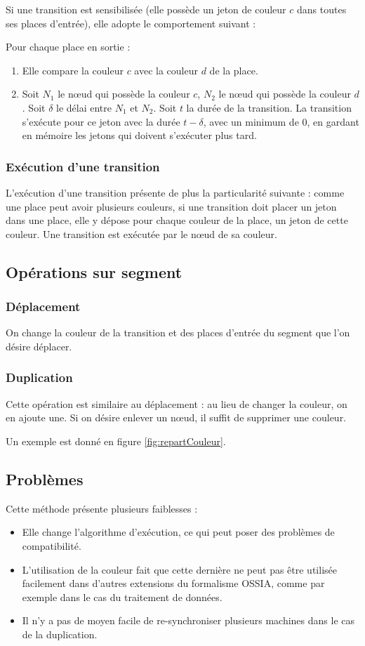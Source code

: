 Si une transition est sensibilisée (elle possède un jeton de couleur $c$ dans toutes ses places d'entrée), elle adopte le comportement suivant : 

Pour chaque place en sortie :
\begin{enumerate}
\item Elle compare la couleur $c$ avec la couleur $d$ de la place. 
\item Soit $N_1$ le nœud qui possède la couleur $c$, $N_2$ le nœud qui possède la couleur $d$. Soit $\delta$ le délai entre $N_1$ et $N_2$. Soit $t$ la durée de la transition. La transition s'exécute pour ce jeton avec la durée $t - \delta$, avec un minimum de 0, en gardant en mémoire les jetons qui doivent s'exécuter plus tard.
\end{enumerate}

\subsubsection{Exécution d'une transition}
L'exécution d'une transition présente de plus la particularité suivante : comme une place peut avoir plusieurs couleurs, si une transition doit placer un jeton dans une place, elle y dépose pour chaque couleur de la place, un jeton de cette couleur. 
Une transition est exécutée par le nœud de sa couleur.

\subsection{Opérations sur segment}
\subsubsection{Déplacement}
On change la couleur de la transition et des places d'entrée du segment que l'on désire déplacer.

\subsubsection{Duplication}
Cette opération est similaire au déplacement : au lieu de changer la couleur, on en ajoute une. Si on désire enlever un nœud, il suffit de supprimer une couleur.

Un exemple est donné en figure \ref{fig:repartCouleur}.

\subsection{Problèmes}
Cette méthode présente plusieurs faiblesses : 
\begin{itemize}
	\item Elle change l'algorithme d'exécution, ce qui peut poser des problèmes de compatibilité.
	\item L'utilisation de la couleur fait que cette dernière ne peut pas être utilisée facilement dans d'autres extensions du formalisme \ac{OSSIA}, comme par exemple dans le cas du traitement de données\cite{arias2014modelling}.
	\item Il n'y a pas de moyen facile de re-synchroniser plusieurs machines dans le cas de la duplication.
\end{itemize}

